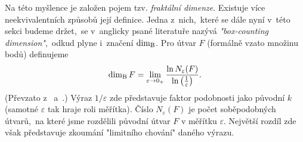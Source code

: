 Na této myšlence je založen pojem tzv. \emph{fraktální dimenze}. Existuje více neekvivalentních způsobů její definice. Jedna z~nich,~které se dále nyní v~této sekci budeme držet,~se v~anglicky psané literatuře nazývá \emph{"box-counting dimension"},~odkud plyne i~značení $\operatorname{dim_B}$. Pro útvar $F$ (formálně vzato množinu bodů) definujeme 
\begin{equation}\label{eq:fraktalni-dimenze}
    \operatorname{dim_B}{F}=\lim_{\varepsilon\to 0_+}{\dfrac{\ln{N_\varepsilon(F)}}{\ln{\left(\frac{1}{\varepsilon}\right)}}}.
\end{equation}
(Převzato z~\cite[str. 93]{Zelinka2006} a~\cite[str. 28]{Falconer2014}.) Výraz $1/\varepsilon$ zde představuje faktor podobnosti jako původní $k$ (samotné $\varepsilon$ tak hraje roli měřítka). Číslo $N_\varepsilon(F)$ je počet soběpodobných útvarů,~na které jsme rozdělili původní útvar $F$ v měřítku $\varepsilon$. Největší rozdíl zde však představuje zkoumání "limitního chování" daného výrazu.

